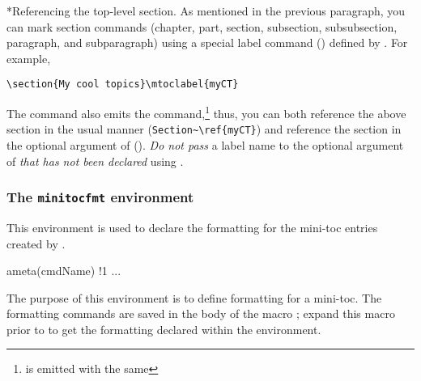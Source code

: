 \documentclass[10pt]{article}
\makeatletter
\renewcommand*{\theparagraph}{\texorpdfstring{\protect\P}{\textparagraph}}
\renewcommand{\paragraph}
    {\renewcommand{\@seccntformat}[1]{\theparagraph\space}%
    \@startsection{paragraph}{4}{0pt}{6pt}{-3pt}{\bfseries}}
\edef\amtIndent{\the\parindent}
\def\MP#1{\marginpar{\raggedleft\small\itshape #1}}
\makeatother
\begin{document}
\paragraph*{Referencing the top-level section.}\label{para:mtocRef} As mentioned
in the previous paragraph, you can mark section commands (chapter, part,
section, subsection, subsubsection, paragraph, and subparagraph) using a
special label command () defined by
. For example,
\begin{Verbatim}[xleftmargin=\amtIndent,fontsize=\small]
\section{My cool topics}\mtoclabel{myCT}
\end{Verbatim}
The  command also emits the 
command,\footnote{ is emitted with the same }
thus, you can both reference the above section in the usual manner
(\verb|Section~\ref{myCT}|) and reference the section in the optional
argument of  (). \emph{Do not
pass}\MP{Warning!} a label name to the optional argument of
 \emph{that has not been declared} using .




\subsubsection{The \texttt{minitocfmt} environment}

This environment is used to declare the formatting for the mini-toc entries created by
.
\bVerb{}%
\setlength{\dimen0}{\wd\webtempboxi+2\fboxsep+2\fboxrule}%
\def\1{\rlap{\mbox{\sffamily\hskip\dimen0 (OK to use \texttt{@} in environment)}}}
\begin{dCmd}[commandchars=!()]{\bxSize}
\begin{minitocfmt}{\!ameta(cmdName)}
!1
... %
\end{minitocfmt}
\end{dCmd}
\eVerb The purpose of this environment is to define formatting for a mini-toc. The formatting
commands are saved in the body of the macro ; expand this macro prior to
 to get the formatting declared within the environment.
\end{document}
